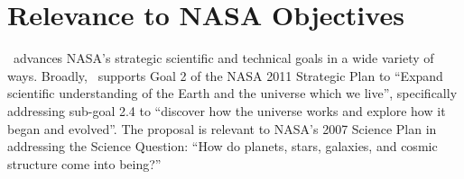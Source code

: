 % 

\clearpage

\parskip0pt
\section{Relevance to NASA Objectives}

\name\ advances NASA's strategic scientific and technical goals in a
wide variety of ways.  Broadly, \name\ supports Goal 2 of the NASA
2011 Strategic Plan to ``Expand scientific understanding of the Earth
and the universe which we live'', specifically addressing sub-goal 2.4
to ``discover how the universe works and explore how it began and
evolved''. The proposal is relevant to NASA's 2007 Science Plan in
addressing the Science Question: ``How do planets, stars, galaxies, and
cosmic structure come into being?''


